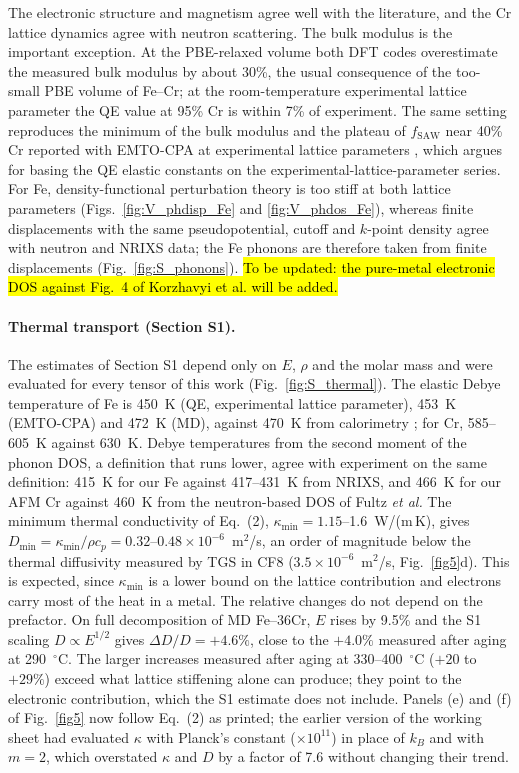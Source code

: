 \documentclass[final,3p,times]{elsarticle}
\DeclareRobustCommand{\upd}[1]{{\sethlcolor{yellow}\hl{To be updated: #1}}}
\begin{document}
The electronic structure and magnetism agree well with the literature, and the Cr lattice dynamics agree with neutron scattering. The bulk modulus is the important exception. At the PBE-relaxed volume both DFT codes overestimate the measured bulk modulus by about 30\%, the usual consequence of the too-small PBE volume of Fe--Cr; at the room-temperature experimental lattice parameter the QE value at 95\% Cr is within 7\% of experiment. The same setting reproduces the minimum of the bulk modulus and the plateau of $f_{\mathrm{SAW}}$ near 40\% Cr reported with EMTO-CPA at experimental lattice parameters \cite{razumovskiy2011first}, which argues for basing the QE elastic constants on the experimental-lattice-parameter series. For Fe, density-functional perturbation theory is too stiff at both lattice parameters (Figs.~\ref{fig:V_phdisp_Fe} and \ref{fig:V_phdos_Fe}), whereas finite displacements with the same pseudopotential, cutoff and $k$-point density agree with neutron and NRIXS data; the Fe phonons are therefore taken from finite displacements (Fig.~\ref{fig:S_phonons}). \upd{the pure-metal electronic DOS against Fig.~4 of Korzhavyi et al. will be added.}

\paragraph{Thermal transport (Section S1).} The estimates of Section S1 depend only on $E$, $\rho$ and the molar mass and were evaluated for every tensor of this work (Fig.~\ref{fig:S_thermal}). The elastic Debye temperature of Fe is 450~K (QE, experimental lattice parameter), 453~K (EMTO-CPA) and 472~K (MD), against 470~K from calorimetry \cite{kittel2005introduction}; for Cr, 585--605~K against 630~K. Debye temperatures from the second moment of the phonon DOS, a definition that runs lower, agree with experiment on the same definition: 415~K for our Fe against 417--431~K from NRIXS, and 466~K for our AFM Cr against 460~K from the neutron-based DOS of Fultz \textit{et al.} The minimum thermal conductivity of Eq.~(2), $\kappa_{\min}=1.15$--1.6~W/(m\,K), gives $D_{\min}=\kappa_{\min}/\rho c_p=0.32$--$0.48\times10^{-6}$~m$^2$/s, an order of magnitude below the thermal diffusivity measured by TGS in CF8 ($3.5\times10^{-6}$~m$^2$/s, Fig.~\ref{fig5}d). This is expected, since $\kappa_{\min}$ is a lower bound on the lattice contribution and electrons carry most of the heat in a metal. The relative changes do not depend on the prefactor. On full decomposition of MD Fe--36Cr, $E$ rises by 9.5\% and the S1 scaling $D\propto E^{1/2}$ gives $\Delta D/D=+4.6\%$, close to the $+4.0\%$ measured after aging at 290~$^\circ$C. The larger increases measured after aging at 330--400~$^\circ$C ($+20$ to $+29\%$) exceed what lattice stiffening alone can produce; they point to the electronic contribution, which the S1 estimate does not include. Panels (e) and (f) of Fig.~\ref{fig5} now follow Eq.~(2) as printed; the earlier version of the working sheet had evaluated $\kappa$ with Planck's constant ($\times10^{11}$) in place of $k_B$ and with $m=2$, which overstated $\kappa$ and $D$ by a factor of 7.6 without changing their trend.
\end{document}
